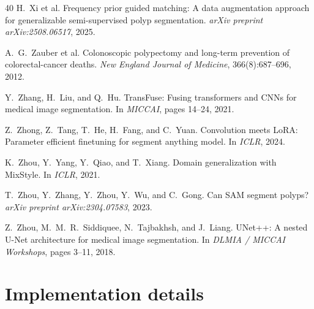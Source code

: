 \documentclass[10pt,twocolumn]{article}
\begin{document}
\begin{thebibliography}{40}
H.~Xi et al.
\newblock Frequency prior guided matching: A data augmentation approach for generalizable semi-supervised polyp segmentation.
\newblock \emph{arXiv preprint arXiv:2508.06517}, 2025.

A.~G.~Zauber et al.
\newblock Colonoscopic polypectomy and long-term prevention of colorectal-cancer deaths.
\newblock \emph{New England Journal of Medicine}, 366(8):687--696, 2012.

Y.~Zhang, H.~Liu, and Q.~Hu.
\newblock TransFuse: Fusing transformers and CNNs for medical image segmentation.
\newblock In \emph{MICCAI}, pages 14--24, 2021.

Z.~Zhong, Z.~Tang, T.~He, H.~Fang, and C.~Yuan.
\newblock Convolution meets LoRA: Parameter efficient finetuning for segment anything model.
\newblock In \emph{ICLR}, 2024.

K.~Zhou, Y.~Yang, Y.~Qiao, and T.~Xiang.
\newblock Domain generalization with MixStyle.
\newblock In \emph{ICLR}, 2021.

T.~Zhou, Y.~Zhang, Y.~Zhou, Y.~Wu, and C.~Gong.
\newblock Can SAM segment polyps?
\newblock \emph{arXiv preprint arXiv:2304.07583}, 2023.

Z.~Zhou, M.~M.~R.~Siddiquee, N.~Tajbakhsh, and J.~Liang.
\newblock UNet++: A nested U-Net architecture for medical image segmentation.
\newblock In \emph{DLMIA / MICCAI Workshops}, pages 3--11, 2018.

\end{thebibliography}

\clearpage
\appendix
\onecolumn

\section{Implementation details}
\label{app:impl}
\end{document}
